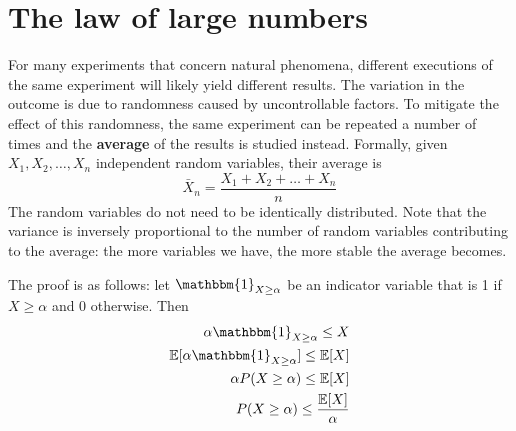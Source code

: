 \section{The law of large numbers}

For many experiments that concern natural phenomena, different executions of the same experiment will likely yield different results. The variation in the outcome is due to randomness caused by uncontrollable factors. To mitigate the effect of this randomness, the same experiment can be repeated a number of times and the \textbf{average} of the results is studied instead. Formally, given $X_1, X_2, \dots, X_n$ independent random variables, their average is
\begin{equation*}
    \bar{X}_n = \frac{X_1 + X_2 + \ldots + X_n}{n}
\end{equation*}
The random variables do not need to be identically distributed. Note that the variance is inversely proportional to the number of random variables contributing to the average: the more variables we have, the more stable the average becomes.

The proof is as follows: let $\mathbbm{1}_{X \geq \alpha}$ be an indicator variable that is 1 if $X \geq \alpha$ and 0 otherwise. Then
\begin{align*}
    \alpha \mathbbm{1}_{X \geq \alpha} \leq X\\
    \E[\alpha \mathbbm{1}_{X \geq \alpha}] \leq \E[X]\\
    \alpha P(X \geq \alpha) \leq \E[X]\\
    P(X \geq \alpha) \leq \frac{\E[X]}{\alpha}
\end{align*}

